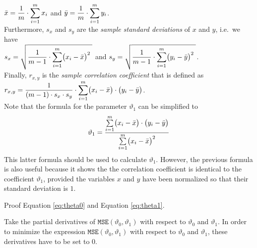 \\[0.2cm]
\hspace*{1.3cm}
$\displaystyle \bar{x} = \frac{1}{m} \cdot \sum\limits_{i=1}^m x_i$ \quad and \quad
$\displaystyle \bar{y} = \frac{1}{m} \cdot \sum\limits_{i=1}^m y_i$.
\\[0.2cm]
Furthermore, $s_x$ and $s_y$ are the \emph{\color{blue}sample standard deviations} of $x$ and $y$, i.e.~we have
\\[0.2cm]
\hspace*{1.3cm}
$\displaystyle s_x = \sqrt{\frac{1}{m-1} \cdot \sum\limits_{i=1}^m \bigl(x_i - \bar{x}\bigr)^2\;}$ \quad and \quad
$\displaystyle s_y = \sqrt{\frac{1}{m-1} \cdot \sum\limits_{i=1}^m \bigl(y_i - \bar{y}\bigr)^2\;}$.
\\[0.2cm]
Finally, $r_{x,y}$ is the \emph{\color{blue}sample correlation coefficient} that is defined as
\\[0.2cm]
\hspace*{1.3cm}
$\displaystyle r_{x,y} = \frac{1}{(m-1) \cdot s_x \cdot s_y} \cdot \sum\limits_{i=1}^m \bigl(x_i - \bar{x}\bigr) \cdot \bigl(y_i - \bar{y}\bigr)$.
\\[0.2cm]
Note that the formula for the parameter $\vartheta_1$ can be simplified to
\begin{equation}
  \label{eq:theta1}
\displaystyle\vartheta_1 = \frac{\sum\limits_{i=1}^m \bigl(x_i - \bar{x}\bigr) \cdot \bigl(y_i - \bar{y}\bigr)}{
                        \sum\limits_{i=1}^m \bigl(x_i - \bar{x}\bigr)^2}  
\end{equation}
This latter formula should be used to calculate $\vartheta_1$.  However, the previous formula is also useful
because it shows the the correlation coefficient is identical to the coefficient $\vartheta_1$, provided the variables $x$ and
$y$ have been normalized so that their standard deviation is $1$.

\exercise
Proof Equation \ref{eq:theta0} and Equation \ref{eq:theta1}.

\hint
Take the partial derivatives of $\mathtt{MSE}(\vartheta_0, \vartheta_1)$ with respect to $\vartheta_0$ and
$\vartheta_1$.  In order to minimize the expression  $\mathtt{MSE}(\vartheta_0, \vartheta_1)$ with respect to
$\vartheta_0$ and $\vartheta_1$, these derivatives have to be set to $0$.
\eox

